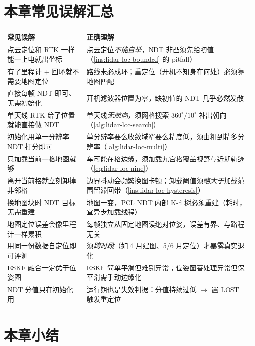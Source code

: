 \section*{本章常见误解汇总}
\begin{table}[H]\centering\small
\begin{tabular}{p{} p{}}
\toprule
\textbf{常见误解} & \textbf{正确理解} \\
\midrule
点云定位和 RTK 一样能一上电就出坐标 & 点云定位\emph{不能自举}，NDT 非凸须先给初值（\cref{ins:lidar-loc-bounded} 的 pitfall）\\
有了里程计 + 回环就不需要地图定位 & 路线未必成环；重定位（开机不知身在何处）必须靠地图匹配 \\
直接每帧 NDT 即可、无需初始化 & 开机滤波器位置为零，缺初值的 NDT 几乎必然发散 \\
单天线 RTK 给了位置就能直接做 NDT & 单天线\emph{无航向}，须网格搜索 $360^\circ/10^\circ$ 补出朝向（\cref{alg:lidar-loc-search}）\\
初始化用单一分辨率 NDT 打分即可 & 单分辨率要么收敛域窄要么精度低，须由粗到精多分辨率（\cref{alg:lidar-loc-multi}）\\
只加载当前一格地图就够 & 车可能在格边缘，须加载九宫格覆盖视野与近期轨迹（\cref{eq:lidar-loc-nine}）\\
离开当前格就立刻卸掉非邻格 & 边界抖动会频繁换图卡顿；卸载阈值须\emph{略大于}加载范围留滞回带（\cref{ins:lidar-loc-hysteresis}）\\
换地图块时 NDT 目标无需重建 & 地图一变，PCL NDT 内部 K-d 树必须重建（耗时，宜异步加载线程）\\
地图定位误差会像里程计一样累积 & 每帧独立从固定地图读绝对位姿，误差有界、与路程无关 \\
用同一份数据自定位即可评测 & 须\emph{跨时段}（如 4 月建图、5/6 月定位）才暴露真实退化 \\
ESKF 融合一定优于位姿图 & ESKF 简单平滑但难剔异常；位姿图善处理异常但保平滑需手动边缘化 \\
NDT 分值只在初始化用 & 运行期也是失效判据：分值持续过低 $\to$ 置 \textsf{LOST} 触发重定位 \\
\bottomrule
\end{tabular}
\end{table}

\section*{本章小结}


